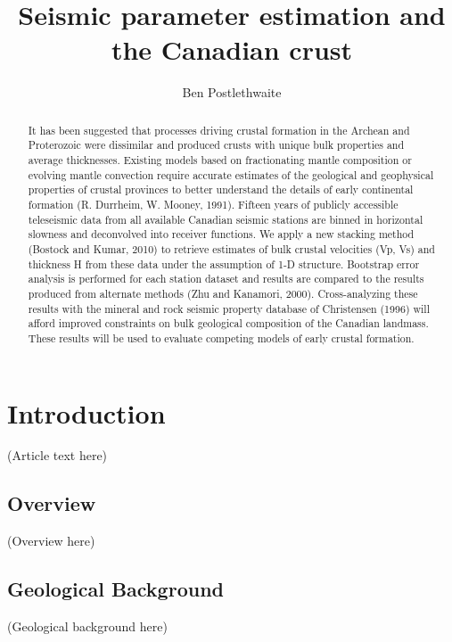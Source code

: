 \documentclass[draft]{article}
\title{Seismic parameter estimation and the Canadian crust}
\author{Ben Postlethwaite}
\begin{document}
\begin{abstract}
   It has been suggested that processes driving crustal formation in the Archean and Proterozoic were dissimilar and produced crusts with unique bulk properties and average thicknesses. Existing models based on fractionating mantle composition or evolving mantle convection require accurate estimates of the geological and geophysical properties of crustal provinces to better understand the details of early continental formation (R. Durrheim, W. Mooney, 1991). Fifteen years of publicly accessible teleseismic data from all available Canadian seismic stations are binned in horizontal slowness and deconvolved into receiver functions. We apply a new stacking method (Bostock and Kumar, 2010) to retrieve estimates of bulk crustal velocities (Vp, Vs) and thickness H from these data under the assumption of 1-D structure. Bootstrap error analysis is performed for each station dataset and results are compared to the results produced from alternate methods (Zhu and Kanamori, 2000). Cross-analyzing these results with the mineral and rock seismic property database of Christensen (1996) will afford improved constraints on bulk geological composition of the Canadian landmass. These results will be used to evaluate competing models of early crustal formation.
\end{abstract}


\section{Introduction}
(Article text here)
\subsection{Overview}
(Overview here)
\subsection{Geological Background}
(Geological background here)

\end{document}
